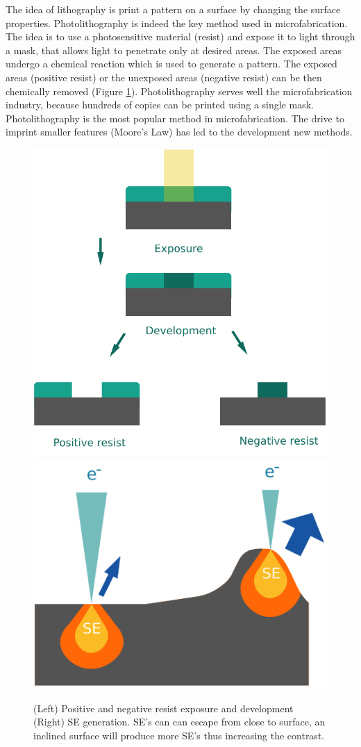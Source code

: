 \documentclass[draft]{jyflluk}
\begin{document}
The idea of lithography is print a pattern on a surface by changing the surface properties.  Photolithography is indeed the key method used in microfabrication. The idea is to use a photosensitive material (resist) and expose it to light through a mask, that allows light to penetrate only at desired areas. The exposed areas undergo a chemical reaction which is used to generate a pattern. The exposed areas (positive resist) or the unexposed areas (negative resist) can be then chemically removed (Figure \ref{fig:SEM}).  Photolithography serves well the microfabrication industry, because hundreds of copies can be printed using a single mask. Photolithography is the most popular method in microfabrication. The drive to imprint smaller features (Moore’s Law) has led to the development new methods.
\cite{franssila2010introduction, lee2010microfabrication}


\begin{figure}[h]%
    \centering
    \includegraphics[width=.48\linewidth]{images/pos_neg_resist.pdf}\quad\includegraphics[width=.43\linewidth]{images/SE.pdf}
    \qquad
    \begin{minipage}{1.2in}
    \end{minipage}%
    \caption{(Left) Positive and negative resist exposure and development (Right) SE generation. SE's can can escape from close to surface, an inclined surface will produce more SE's thus increasing the contrast.}%
    \label{fig:SEM}%
\end{figure}
\end{document}
